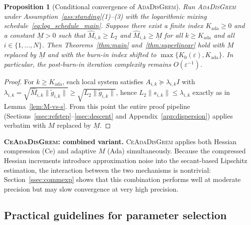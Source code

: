 \documentclass[11pt,a4paper]{article}
\def\cO{O}%
\newtheorem{proposition}[theorem]{Proposition}
\newcommand{\cO}{\mathcal{O}}
\begin{document}
	\begin{proposition}[Conditional convergence of \textsc{AdaDisGrem}]\label{prop:ada_cond}
	Run \textsc{AdaDisGrem} under Assumption~\ref{ass:standing}(1)--(3)
	with the logarithmic mixing schedule~\eqref{eq:log_schedule_main}.
	Suppose there exist a finite index $K_{\mathrm{ada}}\ge 0$ and a
	constant $\underline M>0$ such that
	$\hat M_{i,k}\ge L_2$ and $\hat M_{i,k}\ge \underline M$ for all
	$k\ge K_{\mathrm{ada}}$ and all $i\in\{1,\dots,N\}$.
	Then Theorems~\ref{thm:main} and~\ref{thm:superlinear} hold with
	$M$ replaced by $\underline M$ and with the burn-in index shifted
	to $\max\{K_0(\varepsilon),K_{\mathrm{ada}}\}$.
	In particular, the post-burn-in iteration complexity remains
	$\cO(\varepsilon^{-1})$.
	\end{proposition}
	\begin{proof}
	For $k\ge K_{\mathrm{ada}}$, each local system satisfies
	$A_{i,k}\succeq \lambda_{i,k}I$ with
	$\lambda_{i,k}=\sqrt{\hat M_{i,k}\|\tilde g_{i,k}\|}
	\ge \sqrt{L_2\|\tilde g_{i,k}\|}$,
	hence $L_2\|s_{i,k}\|\le \lambda_{i,k}$ exactly as in
	Lemma~\ref{lem:M-vs-s}.
	From this point the entire proof pipeline
	(Sections~\ref{ssec:refstep}--\ref{ssec:descent} and
	Appendix~\ref{app:dispersion}) applies verbatim with $M$
	replaced by $\underline M$.
	\end{proof}
	
	\smallskip
	\noindent\textbf{\textsc{CeAdaDisGrem}: combined variant.}
	\textsc{CeAdaDisGrem} applies both Hessian compression (Ce) and
	adaptive $M$ (Ada) simultaneously.
	Because the compressed Hessian increments introduce approximation noise
	into the secant-based Lipschitz estimation, the interaction between
	the two mechanisms is nontrivial: Section~\ref{ssec:commexp} shows
	that this combination performs well at moderate precision but may slow
	convergence at very high precision.
	
	\subsection{Practical guidelines for parameter selection}\label{ssec:practical}
	
\end{document}

